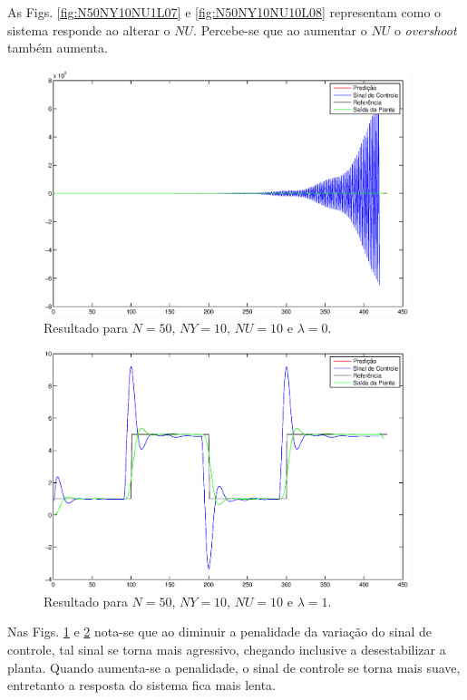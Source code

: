As Figs. \ref{fig:N50NY10NU1L07} e \ref{fig:N50NY10NU10L08} representam como o
sistema responde ao alterar o $NU$.  Percebe-se que ao aumentar o $NU$ o {\it
overshoot} também aumenta.

\begin{figure}[htb]
\centering
    \includegraphics[width=0.95\textwidth]{imgs/questao1/N50NY10NU10L0}
    \caption{Resultado para $N = 50$, $NY = 10$, $NU = 10$ e $\lambda = 0$.}
    \label{fig:N50NY10NU10L0}
\end{figure}

\begin{figure}[htb]
\centering
    \includegraphics[width=0.95\textwidth]{imgs/questao1/N50NY10NU10L1}
    \caption{Resultado para $N = 50$, $NY = 10$, $NU = 10$ e $\lambda = 1$.}
    \label{fig:N50NY10NU10L1}
\end{figure}

Nas Figs. \ref{fig:N50NY10NU10L0} e \ref{fig:N50NY10NU10L1} nota-se que ao
diminuir a penalidade da variação do sinal de controle, tal sinal se torna mais
agressivo, chegando inclusive a desestabilizar a planta. Quando aumenta-se a
penalidade, o sinal de controle se torna mais suave, entretanto a resposta do
sistema fica mais lenta.
